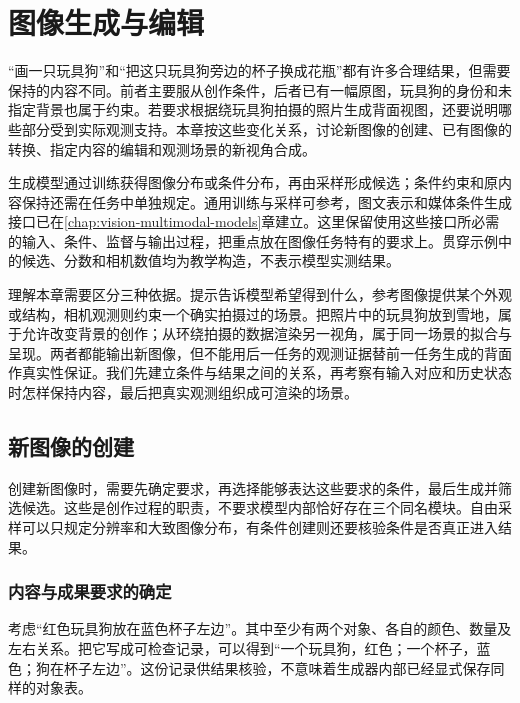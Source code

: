 \chapter{图像生成与编辑}
\label{chap:vision-image-generation}

“画一只玩具狗”和“把这只玩具狗旁边的杯子换成花瓶”都有许多合理结果，但需要保持的内容不同。前者主要服从创作条件，后者已有一幅原图，玩具狗的身份和未指定背景也属于约束。若要求根据绕玩具狗拍摄的照片生成背面视图，还要说明哪些部分受到实际观测支持。本章按这些变化关系，讨论新图像的创建、已有图像的转换、指定内容的编辑和观测场景的新视角合成。

生成模型通过训练获得图像分布或条件分布，再由采样形成候选；条件约束和原内容保持还需在任务中单独规定。通用训练与采样可参考，图文表示和媒体条件生成接口已在\ref{chap:vision-multimodal-models}章建立。这里保留使用这些接口所必需的输入、条件、监督与输出过程，把重点放在图像任务特有的要求上。贯穿示例中的候选、分数和相机数值均为教学构造，不表示模型实测结果。

理解本章需要区分三种依据。提示告诉模型希望得到什么，参考图像提供某个外观或结构，相机观测则约束一个确实拍摄过的场景。把照片中的玩具狗放到雪地，属于允许改变背景的创作；从环绕拍摄的数据渲染另一视角，属于同一场景的拟合与呈现。两者都能输出新图像，但不能用后一任务的观测证据替前一任务生成的背面作真实性保证。我们先建立条件与结果之间的关系，再考察有输入对应和历史状态时怎样保持内容，最后把真实观测组织成可渲染的场景。

\section{新图像的创建}
\label{sec:vision-generation-creation}

创建新图像时，需要先确定要求，再选择能够表达这些要求的条件，最后生成并筛选候选。这些是创作过程的职责，不要求模型内部恰好存在三个同名模块。自由采样可以只规定分辨率和大致图像分布，有条件创建则还要核验条件是否真正进入结果。

\subsection{内容与成果要求的确定}
\label{sec:vision-generation-requirements}

考虑“红色玩具狗放在蓝色杯子左边”。其中至少有两个对象、各自的颜色、数量及左右关系。把它写成可检查记录，可以得到“一个玩具狗，红色；一个杯子，蓝色；狗在杯子左边”。这份记录供结果核验，不意味着生成器内部已经显式保存同样的对象表。

